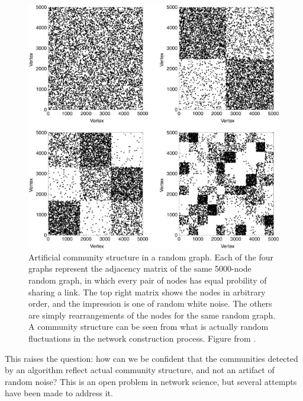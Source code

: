 \begin{figure}
\centering
\includegraphics{img/fortunato2016_fig29_randomcommunities.jpg}
\caption{Artificial community structure in a random graph. Each of the
four graphs represent the adjacency matrix of the same 5000-node random
graph, in which every pair of nodes has equal probility of sharing a
link. The top right matrix shows the nodes in arbitrary order, and the
impression is one of random white noise. The others are simply
rearrangements of the nodes for the same random graph. A community
structure can be seen from what is actually random fluctuations in the
network construction process. Figure from
\autocite{fortunato_community_2016}.}\label{fig:randomcommunities}
\end{figure}

This raises the question: how can we be confident that the communities
detected by an algorithm reflect actual community structure, and not an
artifact of random noise? This is an open problem in network science,
but several attempts have been made to address it.

